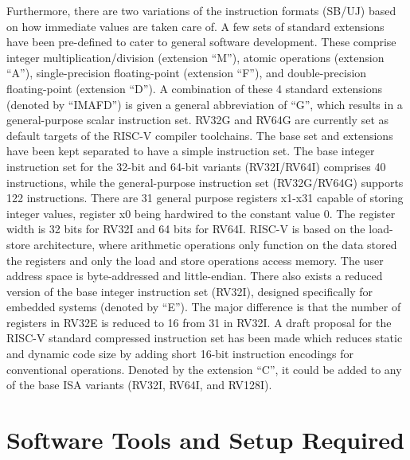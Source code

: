 Furthermore, there are two variations of the instruction formats (SB/UJ) based on how immediate values are taken care of. A few sets of standard extensions have been pre-defined to cater to general software development. These comprise integer multiplication/division (extension “M”), atomic operations (extension “A”), single-precision floating-point (extension “F”), and double-precision floating-point (extension “D”). A combination of these 4 standard extensions (denoted by “IMAFD”) is given a general abbreviation of “G”, which results in a general-purpose scalar instruction set. RV32G and RV64G are currently set as default targets of the RISC-V compiler toolchains. The base set and extensions have been kept separated to have a simple instruction set. \newline\newline
The base integer instruction set for the 32-bit and 64-bit variants (RV32I/RV64I) comprises 40 instructions, while the general-purpose instruction set (RV32G/RV64G) supports 122 instructions. There are 31 general purpose registers x1-x31 capable of storing integer values, register x0 being hardwired to the constant value 0. The register width is 32 bits for RV32I and 64 bits for RV64I. RISC-V is based on the load-store architecture, where arithmetic operations only function on the data stored the registers and only the load and store operations access memory. The user address space is byte-addressed and little-endian. \newline\newline
There also exists a reduced version of the base integer instruction set (RV32I), designed specifically for embedded systems (denoted by “E”). The major difference is that the number of registers in RV32E is reduced to 16 from 31 in RV32I. A draft proposal for the RISC-V standard compressed instruction set has been made which reduces static and dynamic code size by adding short 16-bit instruction encodings for conventional operations. Denoted by the extension “C”, it could be added to any of the base ISA variants (RV32I, RV64I, and RV128I). 

 \section{Software Tools and Setup Required}
  \label{sect6_2}


